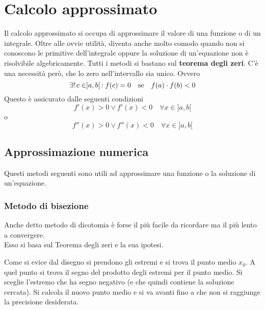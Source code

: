 
\section{Calcolo approssimato}
Il calcolo approssimato si occupa di approssimare il valore di una funzione o di un integrale. Oltre
alle ovvie utilità, diventa anche molto comodo quando non si conoscono le primitive dell'integrale
oppure la soluzione di un'equazione non è risolvibile algebricamente. Tutti i metodi si bastano sul
\textbf{teorema degli zeri}. C'è una necessità però, che lo zero nell'intervallo sia unico. Ovvero
\begin{equation*}
  \exists!\,c\in]a,b[\,: f(c)=0\quad\text{se}\quad f(a)\cdot f(b) < 0
\end{equation*}
Questo è assicurato dalle seguenti condizioni
\begin{equation*}
  f'(x)>0\lor f'(x)<0\quad\forall x\in]a,b[
\end{equation*}
o
\begin{equation*}
  f''(x)>0\lor f''(x)<0\quad\forall x\in]a,b[
\end{equation*}

\subsection{Approssimazione numerica}
Questi metodi seguenti sono utili ad approssimare una funzione o la soluzione di un'equazione.

\subsubsection{Metodo di bisezione}
Anche detto metodo di dicotomia è forse il più facile da ricordare ma il più lento a convergere.\\
Esso si basa sul Teorema degli zeri e la sua ipotesi.
\begin{center}
\end{center}
Come si evice dal disegno si prendono gli estremi e si trova il punto medio $x_0$. A quel punto
si trova il segno del prodotto degli estremi per il punto medio. Si sceglie l'estremo che ha segno
negativo (e che quindi contiene la soluzione cercata). Si calcola il nuovo punto medio e si va
avanti fino a che non si raggiunge la precisione desiderata.


